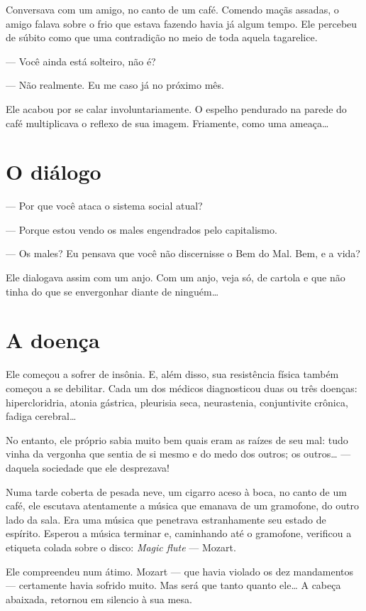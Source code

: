 Conversava com um amigo, no canto de um café. Comendo maçãs assadas, o
amigo falava sobre o frio que estava fazendo havia já algum tempo. Ele
percebeu de súbito como que uma contradição no meio de toda aquela
tagarelice.

--- Você ainda está solteiro, não é?

--- Não realmente. Eu me caso já no próximo mês.

Ele acabou por se calar involuntariamente. O espelho pendurado na parede
do café multiplicava o reflexo de sua imagem. Friamente, como uma
ameaça\ldots{}

\section{O diálogo}

--- Por que você ataca o sistema social atual?

--- Porque estou vendo os males engendrados pelo capitalismo.

--- Os males? Eu pensava que você não discernisse o Bem do Mal. Bem, e a
vida?

Ele dialogava assim com um anjo. Com um anjo, veja só, de cartola e
que não tinha do que se envergonhar diante de ninguém\ldots{}

\section{A doença}

Ele começou a sofrer de insônia. E, além disso, sua resistência física
também começou a se debilitar. Cada um dos médicos diagnosticou duas ou
três doenças: hipercloridria, atonia gástrica, pleurisia seca,
neurastenia, conjuntivite crônica, fadiga cerebral\ldots{}

No entanto, ele próprio sabia muito bem quais eram as raízes de seu mal:
tudo vinha da vergonha que sentia de si mesmo e do medo dos outros; os
outros\ldots{} --- daquela sociedade que ele desprezava!

Numa tarde coberta de pesada neve, um cigarro aceso à boca, no canto de
um café, ele escutava atentamente a música que emanava de um gramofone,
do outro lado da sala. Era uma música que penetrava estranhamente seu
estado de espírito. Esperou a música terminar e, caminhando até o
gramofone, verificou a etiqueta colada sobre o disco: \textit{Magic flute} --- Mozart.

Ele compreendeu num átimo. Mozart --- que havia violado os dez mandamentos
--- certamente havia sofrido muito. Mas será que tanto quanto ele\ldots{} A
cabeça abaixada, retornou em silencio à sua mesa.

